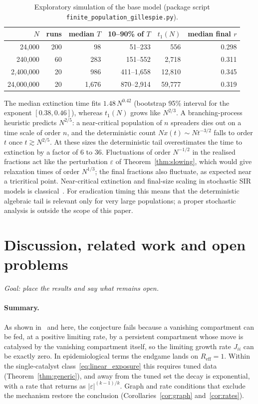 \documentclass[11pt,a4paper]{article}
\theoremstyle{definition}\newtheorem{definition}[theorem]{Definition}
\theoremstyle{remark}\newtheorem{remark}[theorem]{Remark}
\begin{document}
\begin{table}[ht]
\centering\small
\begin{tabular}{rrrrrr}
\toprule
$N$ & runs & median $T$ & 10--90\% of $T$ & $t_1(N)$ & median final $r$\\
\midrule
24{,}000 & 200 & 98 & 51--233 & 556 & 0.298\\
240{,}000 & 60 & 283 & 151--552 & 2{,}718 & 0.311\\
2{,}400{,}000 & 20 & 986 & 411--1{,}658 & 12{,}810 & 0.345\\
24{,}000{,}000 & 20 & 1{,}676 & 870--2{,}914 & 59{,}777 & 0.319\\
\bottomrule
\end{tabular}
\caption{Exploratory simulation of the base model (package script
\texttt{finite\_population\_gillespie.py}).}
\label{tab:gillespie}
\end{table}

The median extinction time fits $1.48\,N^{0.42}$ (bootstrap 95\%
interval for the exponent $[0.38,0.46]$), whereas $t_1(N)$ grows like
$N^{2/3}$. A branching-process heuristic predicts $N^{2/5}$: a near-critical
population of $n$ spreaders dies out on a time scale of order $n$, and
the deterministic count $Nx(t)\sim N t^{-3/2}$ falls to order $t$ once
$t\gtrsim N^{2/5}$.
At these sizes the deterministic tail overestimates the time to
extinction by a factor of 6 to 36. Fluctuations of order $N^{-1/2}$ in
the realised fractions act like the perturbation $\varepsilon$ of
Theorem~\ref{thm:slowing}, which would give relaxation times of order
$N^{1/3}$; the final fractions also fluctuate, as expected near a
tricritical point. Near-critical extinction and final-size scaling in
stochastic SIR models is classical~\cite{MartinLof,BenNaimKrapivsky}.
For eradication timing this means that the deterministic algebraic tail
is relevant only for very large populations; a proper stochastic
analysis is outside the scope of this paper.

\section{Discussion, related work and open problems}
\label{sec:discussion}

\emph{Goal: place the results and say what remains open.}

\paragraph{Summary.} As shown in~\cite{EPprior} and here, the
conjecture fails because a vanishing compartment
can be fed, at a positive limiting rate, by a persistent compartment
whose move is catalysed by the vanishing compartment itself, so the
limiting growth rate $J_{ii}$ can be exactly zero. In epidemiological
terms the endgame lands on $R_{\mathrm{eff}}=1$. Within the
single-catalyst class~\eqref{eq:linear_exposure} this requires tuned
data (Theorem~\ref{thm:generic}), and away from the tuned set the decay
is exponential, with a rate that returns as $|\varepsilon|^{(k-1)/k}$.
Graph and rate conditions that exclude the mechanism restore the
conclusion (Corollaries~\ref{cor:graph} and~\ref{cor:rates}).
\end{document}
